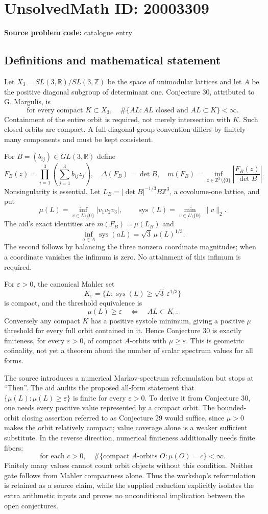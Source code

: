 \documentclass[11pt]{article}
\newcommand{\Z}{\mathbb{Z}}
\newcommand{\R}{\mathbb{R}}
\newcommand{\eps}{\varepsilon}
\begin{document}
\section*{UnsolvedMath ID: 20003309}
\textbf{Source problem code:} catalogue entry
\subsection{Definitions and mathematical statement}
Let $X_3=SL(3,\R)/SL(3,\Z)$ be the space of unimodular lattices and let $A$ be the positive diagonal subgroup of determinant one. Conjecture 30, attributed to G. Margulis, is
\[
 \text{for every compact }K\subset X_3,
 \quad\#\{A L:A L\text{ closed and }A L\subset K\}<\infty.
\]
Containment of the entire orbit is required, not merely intersection with $K$. Such closed orbits are compact. A full diagonal-group convention differs by finitely many components and must be kept consistent.

For $B=(b_{ij})\in GL(3,\R)$ define
\[
 F_B(z)=\prod_{i=1}^3\left(\sum_{j=1}^3b_{ij}z_j\right),\quad
 \Delta(F_B)=\det B,\quad
 m(F_B)=\inf_{z\in\Z^3\setminus\{0\}}
                    \left|\frac{F_B(z)}{\det B}\right|.
\]
Nonsingularity is essential. Let $L_B=|\det B|^{-1/3}B\Z^3$, a covolume-one lattice, and put
\[
 \mu(L)=\inf_{v\in L\setminus\{0\}}|v_1v_2v_3|,
 \qquad\operatorname{sys}(L)=\min_{v\in L\setminus\{0\}}\|v\|_2.
\]
The aid's exact identities are $m(F_B)=\mu(L_B)$ and
\[
 \inf_{a\in A}\operatorname{sys}(aL)=\sqrt3\,\mu(L)^{1/3}.
\]
The second follows by balancing the three nonzero coordinate magnitudes; when a coordinate vanishes the infimum is zero. No attainment of this infimum is required.

For $\eps>0$, the canonical Mahler set
\[
 K_\eps=\{L:\operatorname{sys}(L)\geq\sqrt3\,\eps^{1/3}\}
\]
is compact, and the threshold equivalence is
\[
 \mu(L)\geq\eps\quad\Longleftrightarrow\quad A L\subset K_\eps.
\]
Conversely any compact $K$ has a positive systole minimum, giving a positive $\mu$ threshold for every full orbit contained in it. Hence Conjecture 30 is exactly finiteness, for every $\eps>0$, of compact $A$-orbits with $\mu\geq\eps$. This is geometric cofinality, not yet a theorem about the number of scalar spectrum values for all forms.

The source introduces a numerical Markov-spectrum reformulation but stops at ``Then''. The aid audits the proposed all-form statement that $\{\mu(L):\mu(L)\geq\eps\}$ is finite for every $\eps>0$. To derive it from Conjecture 30, one needs every positive value represented by a compact orbit. The bounded-orbit closing assertion referred to as Conjecture 29 would suffice, since $\mu>0$ makes the orbit relatively compact; value coverage alone is a weaker sufficient substitute. In the reverse direction, numerical finiteness additionally needs finite fibers:
\[
 \text{for each }c>0,\quad
 \#\{\text{compact }A\text{-orbits }O:\mu(O)=c\}<\infty.
\]
Finitely many values cannot count orbit objects without this condition. Neither gate follows from Mahler compactness alone. Thus the workshop's reformulation is retained as a source claim, while the supplied reduction explicitly isolates the extra arithmetic inputs and proves no unconditional implication between the open conjectures.
\end{document}
